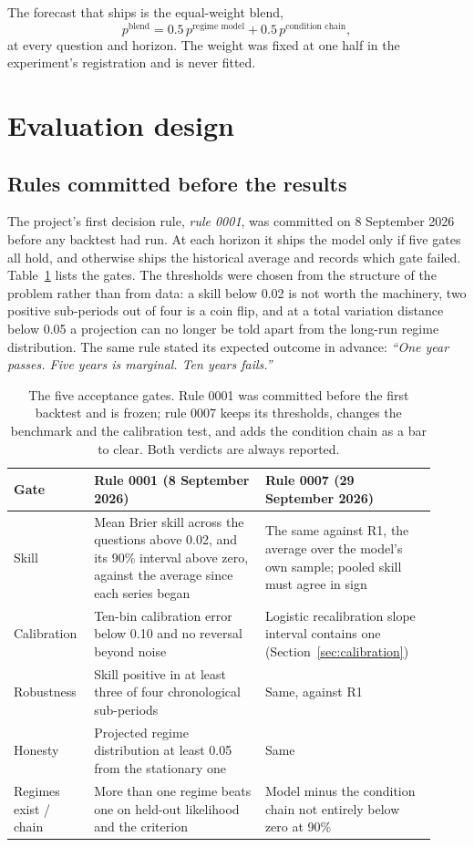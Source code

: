 \documentclass[11pt]{article}
\begin{document}
The forecast that ships is the equal-weight blend,
\begin{equation}
  p^{\text{blend}} = 0.5\, p^{\text{regime model}} + 0.5\, p^{\text{condition chain}},
\end{equation}
at every question and horizon. The weight was fixed at one half in the experiment's registration and is
never fitted.

\section{Evaluation design}\label{sec:evaluation}

\subsection{Rules committed before the results}

The project's first decision rule, \emph{rule 0001}, was committed on 8 September 2026 before any
backtest had run. At each horizon it ships the model only if five gates all hold, and otherwise ships
the historical average and records which gate failed. Table~\ref{tab:gates} lists the gates. The
thresholds were chosen from the structure of the problem rather than from data: a skill below 0.02 is not
worth the machinery, two positive sub-periods out of four is a coin flip, and at a total variation
distance below 0.05 a projection can no longer be told apart from the long-run regime distribution. The
same rule stated its expected outcome in advance: \emph{``One year passes. Five years is marginal. Ten
years fails.''}

\begin{table}[t]
\centering
\caption{The five acceptance gates. Rule 0001 was committed before the first backtest and is frozen;
rule 0007 keeps its thresholds, changes the benchmark and the calibration test, and adds the condition
chain as a bar to clear. Both verdicts are always reported.}
\label{tab:gates}
\small
\begin{tabular}{p{0.16\linewidth}p{0.38\linewidth}p{0.38\linewidth}}
\toprule
Gate & Rule 0001 (8 September 2026) & Rule 0007 (29 September 2026) \\
\midrule
Skill & Mean Brier skill across the questions above 0.02, and its 90\% interval above zero, against
the average since each series began & The same against R1, the average over the model's own sample;
pooled skill must agree in sign \\
Calibration & Ten-bin calibration error below 0.10 and no reversal beyond noise & Logistic
recalibration slope interval contains one (Section~\ref{sec:calibration}) \\
Robustness & Skill positive in at least three of four chronological sub-periods & Same, against R1 \\
Honesty & Projected regime distribution at least 0.05 from the stationary one & Same \\
Regimes exist / chain & More than one regime beats one on held-out likelihood and the criterion &
Model minus the condition chain not entirely below zero at 90\% \\
\bottomrule
\end{tabular}
\end{table}
\end{document}
